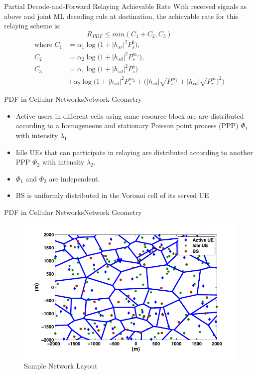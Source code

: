\documentclass{beamer}
\begin{document}
\begin{frame}{Partial Decode-and-Forward Relaying} {Achievable Rate}
\vspace{-1cm}
With received signals as above and joint ML decoding rule at destination, the achievable rate for this relaying scheme is:
\begin{equation*} \label{eq:rate}
R_{PDF} \leq min(C_1+C_2,C_3)
\end{equation*}
\begin{align*}
\text{where } C_1 &= \alpha_1 \log\Big(1+|h_{sr}|^2P_s^b\Big),\\
C_2 &= \alpha_2 \log\Big(1+|h_{sd}|^2P_s^{m_2}\Big),\\
C_3 &= \alpha_1 \log\Big(1+|h_{sd}|^2P_s^b\Big) \\ &+ \alpha_2\log\bigg(1+|h_{sd}|^2P_s^{m_2} + \Big(|h_{sd}|\sqrt{P_s^{m_1}} + |h_{rd}|\sqrt{P_r^m}\Big)^2\bigg)
\end{align*}
\end{frame}

\begin{frame}{PDF in Cellular Networks}{Network Geometry}

\begin{itemize}
\item Active users in different cells using same resource block are are distributed according to a homogeneous and stationary Poisson point process (PPP) $\Phi_1$ with intensity $\lambda_1$
\item Idle UEs that can participate in relaying are distributed according to another PPP $\Phi_2$ with intensity $\lambda_2$.
\item $\Phi_1$ and $\Phi_2$ are independent.
\item BS is uniformly distributed in the Voronoi cell of its served UE
\end{itemize}
\end{frame}

\begin{frame}{PDF in Cellular Networks}{Network Geometry}
\begin{figure}
\centering
\includegraphics[width=\textwidth]{figures/netLayoutPaper.png}
  \caption{Sample Network Layout}
\end{figure}
\end{frame}
\end{document}
